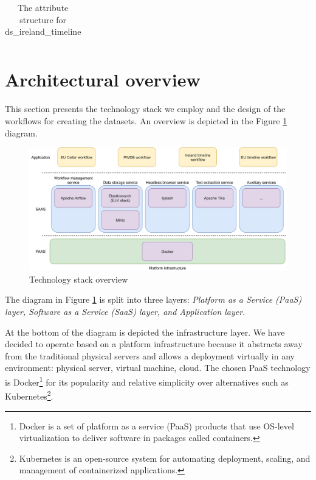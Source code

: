 {\begin{longtable}{p{1.16in}p{3.48in}p{0.62in}}

\caption{The attribute structure for ds\_ireland\_timeline}
\label{tab:dsirelandtimeline}

\end{longtable}}

\section{Architectural overview}

This section presents the technology stack we employ and the design of the workflows for creating the datasets. An overview is depicted in the Figure \ref{fig:Technology_stack_overview} diagram.


\begin{figure}[h]
	\begin{Center}
		\includegraphics[width=\textwidth]{images/image3.png}
		\caption{Technology stack overview}
		\label{fig:Technology_stack_overview}
	\end{Center}
\end{figure}

The diagram in Figure \ref{fig:Technology_stack_overview} is split into three layers: \textit{Platform as a Service (PaaS) layer, Software as a Service (SaaS) layer, and Application layer}. 

\enlargethispage{2em}

At the bottom of the diagram is depicted the infrastructure layer. We have decided to operate based on a platform infrastructure because it abstracts away from the traditional physical servers and allows a deployment virtually in any environment: physical server, virtual machine, cloud. The chosen PaaS technology is Docker\footnote{Docker is a set of platform as a service (PaaS) products that use OS-level virtualization to deliver software in packages called containers. } for its popularity and relative simplicity over alternatives such as Kubernetes\footnote{Kubernetes is an open-source system for automating deployment, scaling, and management of containerized applications.}. 

